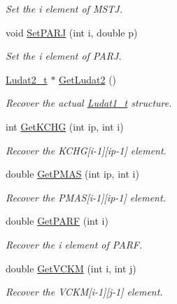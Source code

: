 \begin{DoxyCompactItemize}
\begin{DoxyCompactList}\small\item\em Set the i element of M\+S\+T\+J. \end{DoxyCompactList}\item 
void \hyperlink{class_t_djangoh_a40a5e2d72e700a53329fa10a3854b61e}{Set\+P\+A\+R\+J} (int i, double p)
\begin{DoxyCompactList}\small\item\em Set the i element of P\+A\+R\+J. \end{DoxyCompactList}\item 
\hyperlink{struct_ludat2__t}{Ludat2\+\_\+t} $\ast$ \hyperlink{class_t_djangoh_a64956ca441887fb27e45e795e2aa39c0}{Get\+Ludat2} ()
\begin{DoxyCompactList}\small\item\em Recover the actual \hyperlink{struct_ludat1__t}{Ludat1\+\_\+t} structure. \end{DoxyCompactList}\item 
int \hyperlink{class_t_djangoh_abbd060d5743513e954fb3980e1352d51}{Get\+K\+C\+H\+G} (int ip, int i)
\begin{DoxyCompactList}\small\item\em Recover the K\+C\+H\+G\mbox{[}i-\/1\mbox{]}\mbox{[}ip-\/1\mbox{]} element. \end{DoxyCompactList}\item 
double \hyperlink{class_t_djangoh_af02363ca029e8792ffe67f461d079b32}{Get\+P\+M\+A\+S} (int ip, int i)
\begin{DoxyCompactList}\small\item\em Recover the P\+M\+A\+S\mbox{[}i-\/1\mbox{]}\mbox{[}ip-\/1\mbox{]} element. \end{DoxyCompactList}\item 
double \hyperlink{class_t_djangoh_af2f727443a9cb1305cc4845e47100ab0}{Get\+P\+A\+R\+F} (int i)
\begin{DoxyCompactList}\small\item\em Recover the i element of P\+A\+R\+F. \end{DoxyCompactList}\item 
double \hyperlink{class_t_djangoh_a0b1b9096be193695aab3352ce9f81159}{Get\+V\+C\+K\+M} (int i, int j)
\begin{DoxyCompactList}\small\item\em Recover the V\+C\+K\+M\mbox{[}i-\/1\mbox{]}\mbox{[}j-\/1\mbox{]} element. \end{DoxyCompactList}\item 

\end{DoxyCompactItemize}
